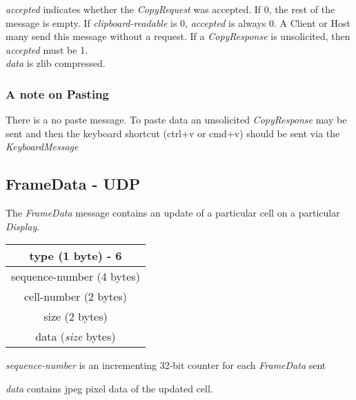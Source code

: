 \documentclass{article}
\begin{document}
    \emph{accepted} indicates whether the \emph{CopyRequest} was accepted. If 0, the rest of the message is empty.
    If \emph{clipboard-readable} is 0, \emph{accepted} is always 0. A Client or Host many send this message without a request.
    If a \emph{CopyResponse} is unsolicited, then \emph{accepted} must be 1.\\

    \emph{data} is zlib compressed.

    \subsubsection{A note on Pasting}

    There is a no paste message. To paste data an unsolicited \emph{CopyResponse} may be sent and then the keyboard
    shortcut (ctrl+v or cmd+v) should be sent via the \emph{KeyboardMessage}

    \subsection{FrameData - UDP}
    The \emph{FrameData} message contains an update of a particular cell on a particular \emph{Display}.

    \begin{center}
        \begin{tabular}{|c|}
            \hline
            type (1 byte) - 6         \\
            \hline
            sequence-number (4 bytes) \\
            \hline
            cell-number (2 bytes)     \\
            \hline
            size (2 bytes)            \\
            \hline
            data (\emph{size} bytes)  \\
            \hline
        \end{tabular}
    \end{center}

    \emph{sequence-number} is an incrementing 32-bit counter for each \emph{FrameData} sent

    \emph{data} contains jpeg pixel data of the updated cell.
\end{document}
